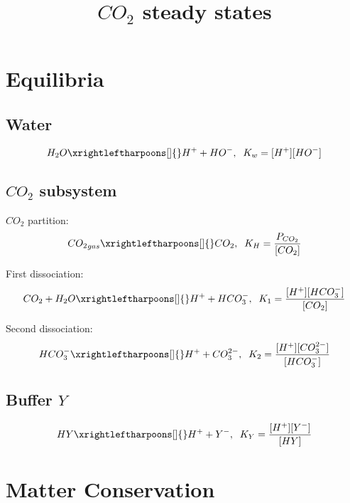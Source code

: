 \documentclass[aps,12pt]{revtex4}
\begin{document}
\title{$CO_2$ steady states}
\maketitle

\section{Equilibria}

\subsection{Water}
\begin{equation}
\label{water}
  H_2O \xrightleftharpoons[]{} H^+ + HO^-, \;\; K_w = [H^+][HO^-]
\end{equation}

\subsection{$CO_2$ subsystem}

$CO_2$ partition:
\begin{equation}
\label{co2_part}
{CO_2}_{gas} \xrightleftharpoons[]{} CO_2, \;\; K_H = \dfrac{P_{CO_2}}{[CO_2]}
\end{equation}

First dissociation:
\begin{equation}
\label{eq1}
CO_2 + H_2O\xrightleftharpoons[]{}  H^+ + HCO_3^-,\;\; K_1 = \dfrac{[H^+][HCO_3^-]}{[CO_2]}
\end{equation}

Second dissociation:
\begin{equation}
\label{eq1}
 HCO_3^- \xrightleftharpoons[]{} H^+ + CO_3^{2-},\;\; K_2 = \dfrac{[H^+][CO_3^{2-}]}{[HCO_3^-]}
\end{equation}

\subsection{Buffer $Y$}

\begin{equation}
\label{buffer}
HY \xrightleftharpoons[]{} H^+ + Y^-, \;\; K_Y = \dfrac{[H^+][Y^-]}{[HY]}
\end{equation}

\section{Matter Conservation}
\end{document}
